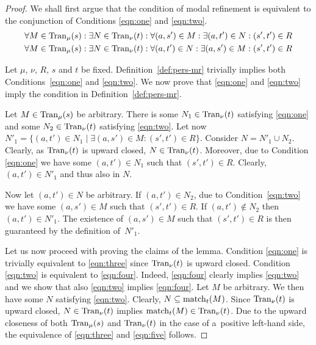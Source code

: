 \begin{proof}
We shall first argue that the condition of modal refinement is equivalent to
the conjunction of Conditions 
\eqref{eqn:one} and \eqref{eqn:two}.
\begin{align}
        \forall M \in \mathrm{Tran}_{\mu}(s) : \exists N \in \mathrm{Tran}_{\nu}(t) :
          \forall (a,s') \in M : \exists (a,t') \in N : (s',t') \in R \label{eqn:one}\\
     \forall M \in \mathrm{Tran}_{\mu}(s) : \exists N \in \mathrm{Tran}_{\nu}(t) :
       \forall (a,t') \in N : \exists (a,s') \in M : (s',t') \in R \label{eqn:two}
\end{align}

Let $\mu$, $\nu$, $R$, $s$ and $t$ be fixed. 
Definition~\ref{def:pers-mr} 
trivially implies both Conditions~\eqref{eqn:one} and \eqref{eqn:two}.
We now prove that \eqref{eqn:one} and \eqref{eqn:two} imply  the condition in
Definition~\ref{def:pers-mr}.

Let $M \in \mathrm{Tran}_{\mu}(s)$ be arbitrary.
There is some $N_1 \in \mathrm{Tran}_{\nu}(t)$ satisfying \eqref{eqn:one} and
some $N_2 \in \mathrm{Tran}_{\nu}(t)$ satisfying \eqref{eqn:two}.
Let now $N'_1 = \{(a,t') \in N_1 \mid \exists (a,s') \in M : (s',t') \in R \}$.
Consider $N = N'_1 \cup N_2$. Clearly, as $\mathrm{Tran}_{\nu}(t)$ is upward closed, 
$N \in \mathrm{Tran}_{\nu}(t)$.
Moreover, due to Condition \eqref{eqn:one} we have some $(a,t') \in N_1$
such that $(s',t') \in R$. Clearly, $(a,t') \in N'_1$ and thus also in $N$.

Now let $(a,t') \in N$ be arbitrary. If $(a,t') \in N_2$, due to Condition~\eqref{eqn:two}
we have some $(a,s') \in M$ such that $(s',t') \in R$.
  If $(a,t') \not\in N_2$ then $(a,t') \in N'_1$.
  The existence of $(a,s') \in M$ such that $(s',t') \in R$ is then
  guaranteed by the definition of~$N'_1$.

Let us now proceed with proving the claims of the lemma.
Condition \eqref{eqn:one} is trivially equivalent 
to \eqref{eqn:three} since $\mathrm{Tran}_{\nu}(t)$ is upward closed.
Condition \eqref{eqn:two} is equivalent to \eqref{eqn:four}. 
Indeed, \eqref{eqn:four} clearly implies \eqref{eqn:two} and
we show that also \eqref{eqn:two} implies \eqref{eqn:four}. 
Let $M$ be arbitrary. We then have some $N$ satisfying \eqref{eqn:two}.
Clearly, $N \subseteq \mathrm{match}_t(M)$. Since $\mathrm{Tran}_{\nu}(t)$ is upward closed,
$N \in \mathrm{Tran}_{\nu}(t)$ implies $\mathrm{match}_t(M) \in \mathrm{Tran}_\nu(t)$.
Due to the upward closeness of both $\mathrm{Tran}_{\mu}(s)$ and $\mathrm{Tran}_{\nu}(t)$
in the case of a~positive left-hand side, 
the equivalence of \eqref{eqn:three} and \eqref{eqn:five} follows.
\end{proof}

